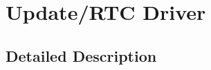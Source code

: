 \hypertarget{group__update__rtc__driver}{\section{Update/\-R\-T\-C Driver}
\label{group__update__rtc__driver}
}


\subsection{Detailed Description}
